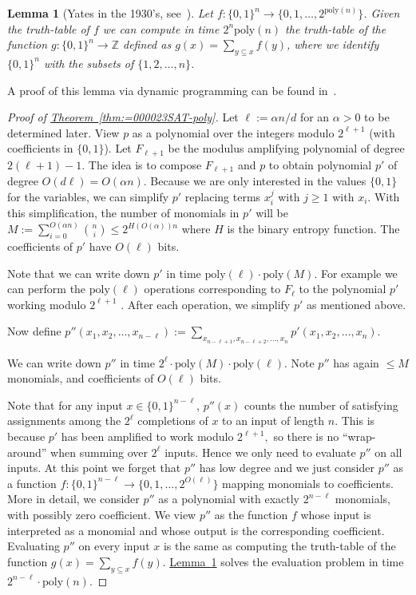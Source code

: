 \documentclass[11pt]{article}
\newcommand{\expref}[2]{\texorpdfstring{\hyperref[#2]{#1~\ref{#2}}}{#1~\ref{#2}}}
\newtheorem{lem}[theorem]{Lemma}  %
\newcommand{\zo}{\{0, 1\}}
\newcommand{\poly}{\mathrm{poly}}
\begin{document}
%
\begin{lem}[{Yates in the 1930's, see~\cite{Williams14-acc-jacm}}] %
%
\label{lem:Yates}
Let $f:\zo^{n}\to\{0,1,\ldots,2^{\poly(n)}\}$. Given the truth-table
of $f$ we can compute in time $2^{n}\poly(n)$ the truth-table of
the function $g:\zo^{n}\to\mathbb{Z}$ defined as $g(x)=\sum_{y\subseteq x}f(y)$,
where we identify $\zo^{n}$ with the subsets of $\{1,2,\ldots,n\}$.
\end{lem}

A proof of this lemma via dynamic programming can be found in~\cite{Williams14-acc-jacm}.
\begin{proof}[Proof of \expref{Theorem}{thm:=000023SAT-poly}] Let $\ell:=\alpha n/d$
for an $\alpha>0$ to be determined later. View $p$ as a polynomial
over the integers modulo $2^{\ell+1}$ (with coefficients in $\zo$).
Let $F_{\ell+1}$ be the modulus amplifying polynomial of degree $2(\ell+1)-1$.
The idea is to compose $F_{\ell+1}$ and $p$ to obtain polynomial
$p'$ of degree $O(d\ell)=O(\alpha n)$. Because we are only interested
in the values $\zo$ for the variables, we can simplify $p'$ replacing
terms $x_{i}^{j}$ with $j\ge1$ with $x_{i}$. With this simplification,
the number of monomials in $p'$ will be $M:=\sum_{i=0}^{O(\alpha n)}\binom{n}{i}\le2^{H(O(\alpha))n}$
where $H$ is the binary entropy function. The coefficients of $p'$
have $O(\ell)$ bits.

Note that we can write down $p'$ in time $\poly(\ell)\cdot\poly(M)$.
For example we can perform the $\poly(\ell)$ operations corresponding
to $F_{\ell}$ to the polynomial $p'$ working modulo $2^{\ell+1}$
. After each operation, we simplify $p'$ as mentioned above.

Now define $p''(x_{1},x_{2},\ldots,x_{n-\ell}):=\sum_{x_{n-\ell+1},x_{n-\ell+2},\ldots,x_{n}}p'(x_{1},x_{2},\ldots,x_{n})$.

We can write down $p''$ in time $2^{\ell}\cdot\poly(M)\cdot\poly(\ell)$.
Note $p''$ has again $\le M$ monomials, and coefficients of $O(\ell)$
bits.

Note that for any input $x\in\zo^{n-\ell}$, $p''(x)$ counts the
number of satisfying assignments among the $2^{\ell}$ completions
of $x$ to an input of length $n$. This is because $p'$ has been
amplified to work modulo $2^{\ell+1},$ so there is no ``wrap-around''
when summing over $2^{\ell}$ inputs. Hence we only need to evaluate
$p''$ on all inputs. At this point we forget that $p''$ has low
degree and we just consider $p''$ as a function $f:\zo^{n-\ell}\to\{0,1,\ldots,2^{O(\ell)}\}$
mapping monomials to coefficients. More in detail, we consider $p''$
as a polynomial with exactly $2^{n-\ell}$ monomials, with possibly
zero coefficient. We view $p''$ as the function $f$ whose input
is interpreted as a monomial and whose output is the corresponding
coefficient. Evaluating $p''$ on every input $x$ is the same as
computing the truth-table of the function $g(x)=\sum_{y\subseteq x}f(y)$.
\expref{Lemma}{lem:Yates} solves the evaluation problem in time $2^{n-\ell}\cdot\poly(n)$.


\end{proof}
\end{document}
